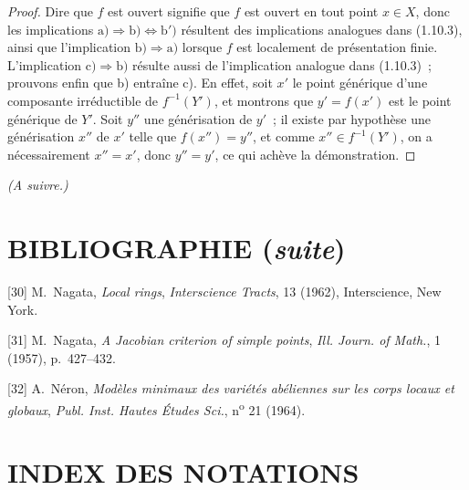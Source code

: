 \begin{proof}
Dire que $f$ est ouvert signifie que $f$ est ouvert en tout point $x\in X$,
donc les implications
$\mathrm{a)}\Rightarrow\mathrm{b)}\Leftrightarrow\mathrm{b')}$ résultent des
implications analogues dans (1.10.3), ainsi que l'implication
$\mathrm{b)}\Rightarrow\mathrm{a)}$ lorsque $f$ est localement de présentation
finie. L'implication $\mathrm{c)}\Rightarrow\mathrm{b)}$ résulte aussi de
l'implication analogue dans (1.10.3)~; prouvons enfin que b) entraîne c). En
effet, soit $x'$ le point générique d'une composante
irréductible de $f^{-1}(Y')$, et montrons que $y'=f(x')$ est le point générique
de $Y'$. Soit $y''$ une générisation de $y'$~; il existe par hypothèse une
générisation $x''$ de $x'$ telle que $f(x'')=y''$, et comme
$x''\in f^{-1}(Y')$, on a nécessairement $x''=x'$, donc $y''=y'$, ce qui
achève la démonstration.
\end{proof}

\begin{center}
\emph{(A suivre.)}
\end{center}

\clearpage
{}
{}
\section*{BIBLIOGRAPHIE (\emph{suite})}

\begingroup
\small
\setlength{\parindent}{0pt}
\setlength{\parskip}{3pt}
[30] M.~Nagata, \emph{Local rings}, \emph{Interscience Tracts}, 13 (1962),
Interscience, New York.

[31] M.~Nagata, \emph{A Jacobian criterion of simple points},
\emph{Ill. Journ. of Math.}, 1 (1957), p.~427--432.

[32] A.~Néron, \emph{Modèles minimaux des variétés abéliennes sur les corps
locaux et globaux}, \emph{Publ. Inst. Hautes Études Sci.}, n\textsuperscript{o}
21 (1964).

\clearpage
{}
{}
\section*{INDEX DES NOTATIONS}

